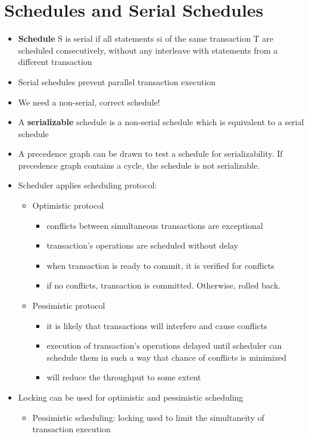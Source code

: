 \documentclass{report}
\begin{document}
	\section{Schedules and Serial Schedules}
	\begin{itemize}
		\item \textbf{Schedule} S is serial if all statements si of the same transaction T are scheduled
		consecutively, without any interleave with statements from a different transaction
		\item Serial schedules prevent parallel transaction execution
		\item We need a non-serial, correct schedule!
		\item A \textbf{serializable} schedule is a non-serial schedule which is equivalent to a serial schedule
		\item A precedence graph can be drawn to test a schedule for serializability. If precedence graph contains a cycle, the schedule is not serializable.
		\item Scheduler applies scheduling protocol:
		\begin{itemize}
			\item Optimistic protocol
			\begin{itemize}
				\item conflicts between simultaneous transactions are exceptional
				\item transaction’s operations are scheduled without delay
				\item when transaction is ready to commit, it is verified for conflicts
				\item if no conflicts, transaction is committed. Otherwise, rolled back.
			\end{itemize}
			\item Pessimistic protocol
			\begin{itemize}
				\item it is likely that transactions will interfere and cause conflicts
				\item execution of transaction’s operations delayed until scheduler can schedule them in such a way that chance of conflicts is minimized
				\item will reduce the throughput to some extent
			\end{itemize}
		\end{itemize}
		\item Locking can be used for optimistic and pessimistic scheduling
		\begin{itemize}
			\item Pessimistic scheduling: locking used to limit the simultaneity of transaction execution

\end{itemize}
\end{itemize}
\end{document}

